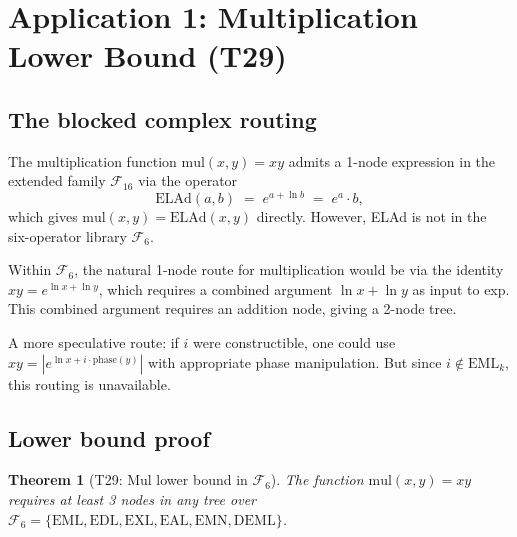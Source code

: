 \documentclass[11pt]{article}
\newtheorem{theorem}{Theorem}[section]
\begin{document}
\section{Application 1: Multiplication Lower Bound (T29)}

\subsection{The blocked complex routing}

The multiplication function $\mathrm{mul}(x,y) = xy$ admits a 1-node expression
in the extended family $\mathcal{F}_{16}$ via the operator
\[
  \mathrm{ELAd}(a,b) \;=\; e^{a + \ln b} \;=\; e^a \cdot b,
\]
which gives $\mathrm{mul}(x,y) = \mathrm{ELAd}(x, y)$ directly.
However, ELAd is not in the six-operator library $\mathcal{F}_6$.

Within $\mathcal{F}_6$, the natural 1-node route for multiplication would be
via the identity $xy = e^{\ln x + \ln y}$, which requires a combined argument
$\ln x + \ln y$ as input to exp.  This combined argument requires an addition
node, giving a 2-node tree.

A more speculative route: if $i$ were constructible, one could use
$xy = |e^{\ln x + i \cdot \mathrm{phase}(y)}|$ with appropriate phase manipulation.
But since $i \notin \mathrm{EML}_k$, this routing is unavailable.

\subsection{Lower bound proof}

\begin{theorem}[T29: Mul lower bound in $\mathcal{F}_6$]
\label{thm:mulLB}
The function $\mathrm{mul}(x,y) = xy$ requires at least 3 nodes in any tree
over $\mathcal{F}_6 = \{\mathrm{EML}, \mathrm{EDL}, \mathrm{EXL}, \mathrm{EAL}, \mathrm{EMN}, \mathrm{DEML}\}$.
\end{theorem}
\end{document}
